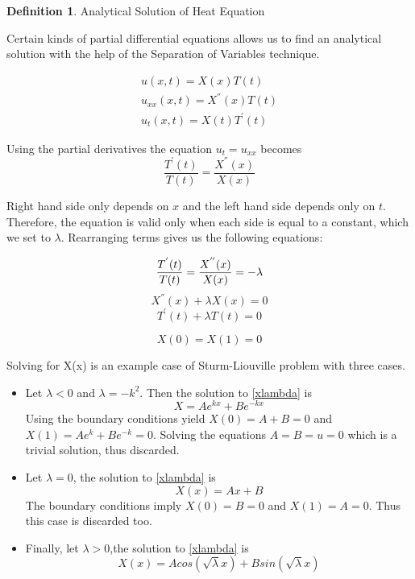 \documentclass[12pt, oneside]{book}
\theoremstyle{plain}
\theoremstyle{definition}
\newtheorem{definition}[theorem]{Definition}
\begin{document}
\begin{definition}\label{heatAnal} Analytical Solution of Heat Equation

Certain kinds of partial differential equations allows us to find an analytical solution with the help of the Separation of Variables technique.

\begin{eqnarray}
u(x,t) = X(x) T(t) \\[10pt]
u_{xx}(x, t) = X^{''}(x) T(t) \\[10pt]
u_t (x,t) = X(t) T^{'}(t)
\end{eqnarray}

Using the partial derivatives the equation $ u_t = u_{xx} $ becomes
\begin{equation}
\frac{T^{'}(t)}{T(t)}  = \frac{X^{''}(x)}{X(x)}
\end{equation}

Right hand side only depends on $x$ and the left hand side depends only on $t$. Therefore, the equation is valid only when each side is equal to a constant, which we set to $ \lambda $. Rearranging terms gives us the following equations:

\begin{equation}
\frac{T^{'}(t)}{T(t)}  = \frac{X^{''}(x)}{X(x)} = -\lambda \\[10pt]
\end{equation}
\begin{equation}\label{xlambda}
X^{''}(x)  + \lambda X(x) = 0 
\end{equation}
\begin{equation}\label{tlambda}
T^{'}(t) + \lambda T(t) = 0
\end{equation}

\begin{equation}
X(0) = X(1) = 0
\end{equation}

Solving for X(x) is an example case of Sturm-Liouville problem \cite{sepvar} with three cases. 
\begin{itemize}
\item Let $\lambda < 0$ and $\lambda = -k^2$. Then the solution to \ref{xlambda} is
$$ X = Ae^{kx} + Be^{-kx} $$
Using the boundary conditions yield $X(0) = A + B = 0 $ and $X(1) = Ae^{k} + Be^{-k} = 0$. Solving the equations $A=B=u=0$ which is a trivial solution, thus discarded.
\item Let $\lambda = 0$, the solution to \ref{xlambda} is
$$ X(x) = Ax + B $$
The boundary conditions imply $X(0) = B = 0$ and $X(1) = A= 0$. Thus this case is  discarded too.
\item Finally, let $\lambda>0$,the solution to \ref{xlambda} is
$$ X(x) = Acos(\sqrt{\lambda}x) + Bsin(\sqrt{\lambda}x) $$


\end{itemize}
\end{definition}
\end{document}
